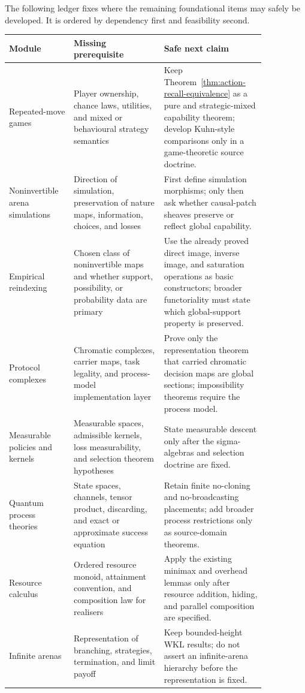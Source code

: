\documentclass[11pt]{article}
\theoremstyle{plain}
\theoremstyle{definition}
\theoremstyle{remark}
\begin{document}
The following ledger fixes where the remaining foundational items may safely be
developed. It is ordered by dependency first and feasibility second.
\begin{center}
\begin{tabular}{@{}p{0.20\linewidth}p{0.31\linewidth}p{0.34\linewidth}@{}}
\toprule
Module & Missing prerequisite & Safe next claim\\
\midrule
Repeated-move games & Player ownership, chance laws, utilities, and mixed or
behavioural strategy semantics & Keep
Theorem~\ref{thm:action-recall-equivalence} as a pure and strategic-mixed
capability theorem; develop Kuhn-style comparisons only in a game-theoretic
source doctrine.\\
Noninvertible arena simulations & Direction of simulation, preservation of
nature maps, information, choices, and losses & First define simulation
morphisms; only then ask whether causal-patch sheaves preserve or reflect
global capability.\\
Empirical reindexing & Chosen class of noninvertible maps and whether support,
possibility, or probability data are primary & Use the already proved direct
image, inverse image, and saturation operations as basic constructors; broader
functoriality must state which global-support property is preserved.\\
Protocol complexes & Chromatic complexes, carrier maps, task legality, and
process-model implementation layer & Prove only the representation theorem that
carried chromatic decision maps are global sections; impossibility theorems
require the process model.\\
Measurable policies and kernels & Measurable spaces, admissible kernels, loss
measurability, and selection theorem hypotheses & State measurable descent only
after the sigma-algebras and selection doctrine are fixed.\\
Quantum process theories & State spaces, channels, tensor product, discarding,
and exact or approximate success equation & Retain finite no-cloning and
no-broadcasting placements; add broader process restrictions only as
source-domain theorems.\\
Resource calculus & Ordered resource monoid, attainment convention, and
composition law for realisers & Apply the existing minimax and overhead lemmas
only after resource addition, hiding, and parallel composition are specified.\\
Infinite arenas & Representation of branching, strategies, termination, and
limit payoff & Keep bounded-height WKL results; do not assert an infinite-arena
hierarchy before the representation is fixed.\\
\bottomrule
\end{tabular}
\end{center}
\end{document}
